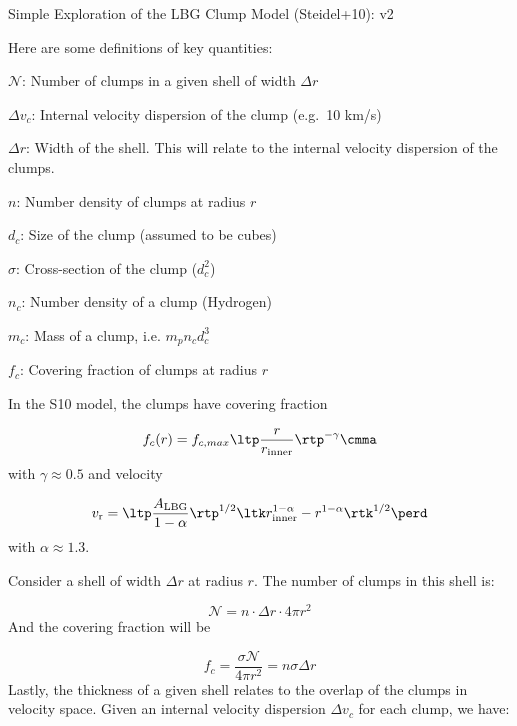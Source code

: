 \documentclass[11pt,letterpaper]{article}
\newcommand{\nc}{$\mathcal{N}$}
\newcommand{\mnc}{\mathcal{N}}
\newcommand{\mvr}{v_{\rm r}}
\newenvironment{my_itemize}{
\begin{itemize}
  \setlength{\itemsep}{1pt}
  \setlength{\parskip}{0pt}
  \setlength{\parsep}{0pt}}{\end{itemize}
}
\begin{document}
\begin{center}
{\Large Simple Exploration of the LBG Clump Model (Steidel+10): v2}
\end{center}

Here are some definitions of key quantities: 

\begin{my_itemize}
\item \nc: Number of clumps in a given shell of width $\Delta r$
\item $\Delta v_c$: Internal velocity dispersion of the clump (e.g.\
  10 km/s)
\item $\Delta r$: Width of the shell. This will relate to the internal
  velocity dispersion of the clumps.
\item $n$: Number density of clumps at radius $r$
\item $d_c$: Size of the clump (assumed to be cubes)
\item $\sigma$: Cross-section of the clump ($d_c^2$)
\item $n_c$: Number density of a clump (Hydrogen)
\item $m_c$: Mass of a clump, i.e. $m_p n_c d_c^3$
\item $f_c$: Covering fraction of clumps at radius $r$
\end{my_itemize}

In the S10 model, the clumps have covering fraction

\begin{equation}
f_c(r) = f_{c,max} \ltp \frac{r}{r_{\rm inner}} \rtp^{-\gamma} \cmma
\label{eqn:covering}
\end{equation}
with $\gamma \approx 0.5$ and velocity

\begin{equation}
\mvr = \ltp \frac{A_{\rm LBG}}{1-\alpha} \rtp^{1/2} \ltk r_{\rm
  inner}^{1-\alpha} - r^{1-\alpha} \rtk^{1/2} \perd
\label{eqn:LBG_vlaw}
\end{equation}
with $\alpha \approx 1.3$.

Consider a shell of width $\Delta r$ at radius $r$.   The number of
clumps in this shell is:

\begin{equation}
\mnc = n \cdot \Delta r \cdot 4 \pi r^2
\end{equation}
And the covering fraction will be

\begin{equation}
f_c = \frac{\sigma \mnc}{4 \pi r^2} = n \sigma \Delta r
\end{equation}
Lastly, the thickness of a given shell relates to the overlap of the
clumps in velocity space.  Given an internal velocity dispersion $\Delta
v_c$ for each clump, we have:
\end{document}
